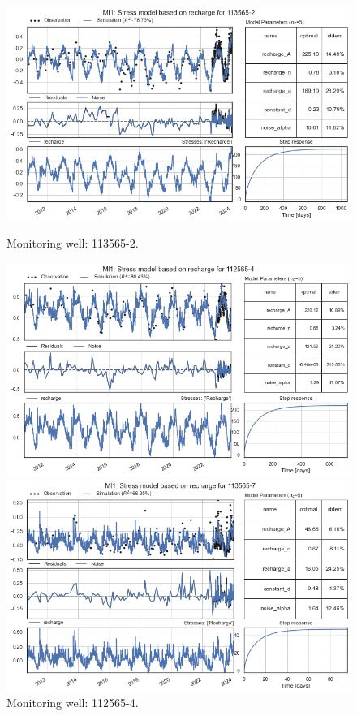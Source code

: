 \begin{figure}[htbp]
    \centering
    \begin{minipage}{0.32\textwidth}
        \centering
        \includegraphics[width=\linewidth]{frontmatter/Rozenburg-fig/10.png}
        \caption{Monitoring well: 113565-2.}
        \label{fig:112565-3}
    \end{minipage}
    \hfill
    \begin{minipage}{0.32\textwidth}
        \centering
        \includegraphics[width=\linewidth]{frontmatter/Rozenburg-fig/11.png}
        \caption{Monitoring well: 112565-4.}
        \label{fig:112565-3}
    \end{minipage}
    \hfill
    \begin{minipage}{0.32\textwidth}
        \centering
        \includegraphics[width=\linewidth]{frontmatter/Rozenburg-fig/12.png}

\end{minipage}
\end{figure}
